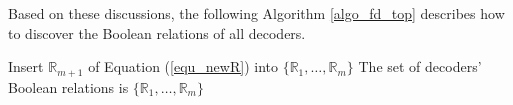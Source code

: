 \documentclass[journal]{IEEEtran}
\begin{document}
%


Based on these discussions,
the following Algorithm \ref{algo_fd_top} describes how to discover the Boolean relations of all decoders.

\begin{algorithm}
\caption{$DiscoveringDecoders$}
\label{algo_fd_top}
\begin{algorithmic}[1]
\label{algo_fd_top_fdtest}
\STATE Insert $\mathbb{R}_{m+1}$ of Equation (\ref{equ_newR}) into $\{\mathbb{R}_1,\dots,\mathbb{R}_m\}$
\label{algo_fd_top_newrel}
\ENDWHILE
\STATE The set of decoders' Boolean relations is $\{\mathbb{R}_1,\dots,\mathbb{R}_m\}$
\end{algorithmic}
\end{algorithm}



\end{document}
